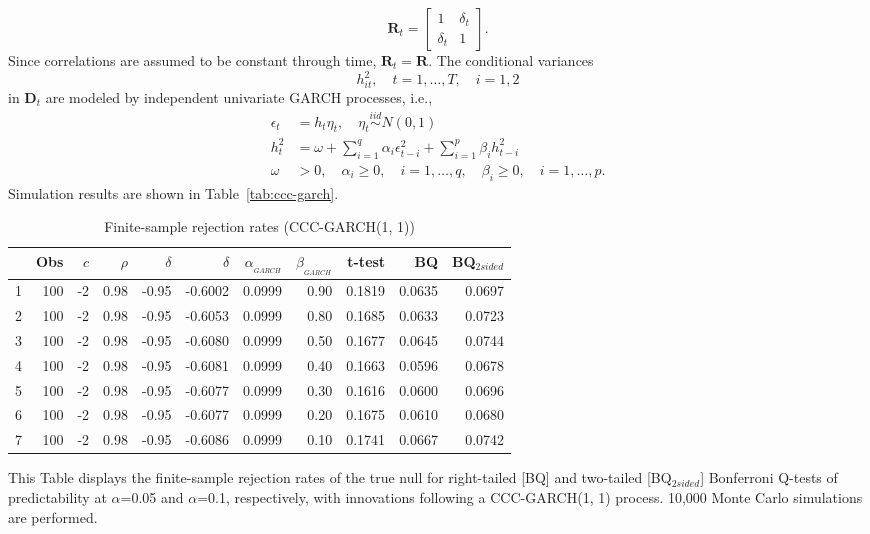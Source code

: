 \documentclass[11pt, a4paper]{article}
\begin{document}
\begin{equation}
\boldsymbol{R}_{t}=\left[\begin{array}{cc}{1} & {\delta_{ t}} \\ {\delta_{ t}} & {1}\end{array}\right].
\end{equation}
Since correlations are assumed to be constant through time, $\boldsymbol{R}_{t}=\boldsymbol{R}$. The conditional variances 
$${h}_{i t}^{2}, \quad t=1, \ldots, T, \quad i=1, 2$$
in $\boldsymbol{D}_{t}$ are modeled by independent univariate GARCH processes, i.e.,
\begin{equation}
\label{eqn:garch}
\begin{aligned} \epsilon_{t} &=h_{t} \eta_{t}, \quad \eta_{t} \stackrel{i i d}{\sim}N(0,1) \\ h_{t}^{2} &=\omega+\sum_{i=1}^{q} \alpha_{i} \epsilon_{t-i}^{2}+\sum_{i=1}^{p} \beta_{i} h_{t-i}^{2} \\ \omega &>0, \quad \alpha_{i} \geq 0, \quad i=1, \ldots, q, \quad \beta_{i} \geq 0, \quad i=1, \ldots, p. \end{aligned}
\end{equation}
Simulation results are shown in Table~\vref{tab:ccc-garch}.
\begin{table}[ht]
\centering
\caption{Finite-sample rejection rates (CCC-GARCH(1, 1)) }
\label{tab:ccc-garch}
\begin{threeparttable}
\begin{tabular}{rrrrrrrrrrr}
  \hline
 & Obs & $c$ & $\rho$ & $\delta$ &$\hat{\delta}$ & $\alpha_{_{GARCH}}$ & $\beta_{_{GARCH}}$ & t-test &BQ& BQ$_{{2sided}}$ \\ 
  \hline
1 & 100 & -2 & 0.98 & -0.95 & -0.6002 & 0.0999 & 0.90 & 0.1819 & 0.0635 & 0.0697 \\ 
  2 & 100 & -2 & 0.98 & -0.95 & -0.6053 & 0.0999 & 0.80 & 0.1685 & 0.0633 & 0.0723 \\ 
  3 & 100 & -2 & 0.98 & -0.95 & -0.6080 & 0.0999 & 0.50 & 0.1677 & 0.0645 & 0.0744 \\ 
  4 & 100 & -2 & 0.98 & -0.95 & -0.6081 & 0.0999 & 0.40 & 0.1663 & 0.0596 & 0.0678 \\ 
  5 & 100 & -2 & 0.98 & -0.95 & -0.6077 & 0.0999 & 0.30 & 0.1616 & 0.0600 & 0.0696 \\ 
  6 & 100 & -2 & 0.98 & -0.95 & -0.6077 & 0.0999 & 0.20 & 0.1675 & 0.0610 & 0.0680 \\ 
  7 & 100 & -2 & 0.98 & -0.95 & -0.6086 & 0.0999 & 0.10 & 0.1741 & 0.0667 & 0.0742 \\ 
   \hline
\end{tabular}
 \begin{tablenotes}
 \small
\item This Table displays the finite-sample rejection rates of the true null for right-tailed  [BQ] and two-tailed  [BQ$_{{2sided}}$] Bonferroni Q-tests of predictability at $\alpha$=0.05 and $\alpha$=0.1, respectively, with innovations following a CCC-GARCH(1, 1) process. 10,000 Monte Carlo simulations are performed.
\end{tablenotes}
\end{threeparttable}
\end{table}
\end{document}
